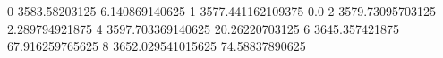 0 3583.58203125 6.140869140625
1 3577.441162109375 0.0
2 3579.73095703125 2.289794921875
4 3597.703369140625 20.26220703125
6 3645.357421875 67.916259765625
8 3652.029541015625 74.58837890625
